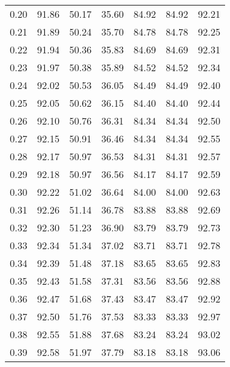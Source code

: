 \begin{tabular}{|c|c|c|c|c|c|c|}
      0.20 &     91.86 &     50.17 &      35.60 &   84.92 &      84.92 &         92.21 \\
      0.21 &     91.89 &     50.24 &      35.70 &   84.78 &      84.78 &         92.25 \\
      0.22 &     91.94 &     50.36 &      35.83 &   84.69 &      84.69 &         92.31 \\
      0.23 &     91.97 &     50.38 &      35.89 &   84.52 &      84.52 &         92.34 \\
      0.24 &     92.02 &     50.53 &      36.05 &   84.49 &      84.49 &         92.40 \\
      0.25 &     92.05 &     50.62 &      36.15 &   84.40 &      84.40 &         92.44 \\
      0.26 &     92.10 &     50.76 &      36.31 &   84.34 &      84.34 &         92.50 \\
      0.27 &     92.15 &     50.91 &      36.46 &   84.34 &      84.34 &         92.55 \\
      0.28 &     92.17 &     50.97 &      36.53 &   84.31 &      84.31 &         92.57 \\
      0.29 &     92.18 &     50.97 &      36.56 &   84.17 &      84.17 &         92.59 \\
      0.30 &     92.22 &     51.02 &      36.64 &   84.00 &      84.00 &         92.63 \\
      0.31 &     92.26 &     51.14 &      36.78 &   83.88 &      83.88 &         92.69 \\
      0.32 &     92.30 &     51.23 &      36.90 &   83.79 &      83.79 &         92.73 \\
      0.33 &     92.34 &     51.34 &      37.02 &   83.71 &      83.71 &         92.78 \\
      0.34 &     92.39 &     51.48 &      37.18 &   83.65 &      83.65 &         92.83 \\
      0.35 &     92.43 &     51.58 &      37.31 &   83.56 &      83.56 &         92.88 \\
      0.36 &     92.47 &     51.68 &      37.43 &   83.47 &      83.47 &         92.92 \\
      0.37 &     92.50 &     51.76 &      37.53 &   83.33 &      83.33 &         92.97 \\
      0.38 &     92.55 &     51.88 &      37.68 &   83.24 &      83.24 &         93.02 \\
      0.39 &     92.58 &     51.97 &      37.79 &   83.18 &      83.18 &         93.06 \\

\end{tabular}
